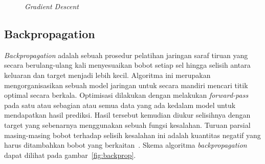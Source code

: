 \begin{figure}[htbp]
    \begin{center}
    \end{center}
    \vspace{-20pt}
    \captionsetup{labelfont=bf, textfont=bf}
    \caption{\textit{Gradient Descent}}
    \vspace{-10pt}
    \captionsetup{labelfont=md, textfont=md}
    \label{fig:gradientdescent}
\end{figure}

\subsection{Backpropagation}

\textit{Backpropagation} adalah sebuah prosedur pelatihan jaringan saraf tiruan yang secara
berulang-ulang kali menyesuaikan bobot setiap sel hingga selisih antara keluaran dan target menjadi
lebih kecil. Algoritma ini merupakan mengorganisasikan sebuah model jaringan untuk secara mandiri
mencari titik optimal secara berkala. Optimisasi dilakukan dengan melakukan \textit{forward-pass}
pada satu atau sebagian atau semua data yang ada kedalam model untuk mendapatkan hasil prediksi.
Hasil tersebut kemudian diukur selisihnya dengan target yang sebenarnya menggunakan sebuah fungsi
kesalahan. Turuan parsial masing-masing bobot terhadap selisih kesalahan ini adalah kuantitas negatif
yang harus ditambahkan bobot yang berkaitan~\cite{Rumelhart:1986we}. Skema algoritma \textit{backpropagation}
dapat dilihat pada gambar~\ref{fig:backprop}.

